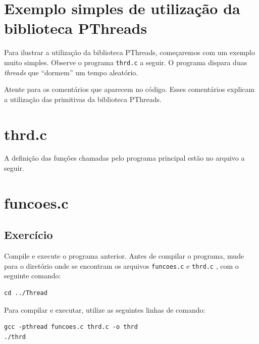 \section{Exemplo simples de utilização da biblioteca PThreads}
Para ilustrar a utilização da biblioteca PThreads, começaremos com um exemplo muito simples. Observe o programa \texttt{thrd.c} a seguir. O programa dispara duas \textit{threads} que \enquote{dormem} um tempo aleatório. 

Atente para os comentários que aparecem no código. Esses comentários explicam a utilização das primitivas da biblioteca PThreads.

\section*{thrd.c}


A definição das funções chamadas pelo programa principal estão no arquivo a seguir.

\section*{funcoes.c}




\subsection{Exercício}
Compile e execute o programa anterior. Antes de compilar o programa, mude para o diretório onde se encontram os arquivos \texttt{funcoes.c} e \texttt{thrd.c} , com o seguinte comando:

\begin{lstlisting}[style=MyBashStyle]
cd ../Thread
\end{lstlisting}

Para compilar e executar, utilize as seguintes linhas de comando:

\begin{lstlisting}[style=MyBashStyle]
gcc -pthread funcoes.c thrd.c -o thrd
./thrd
\end{lstlisting}


